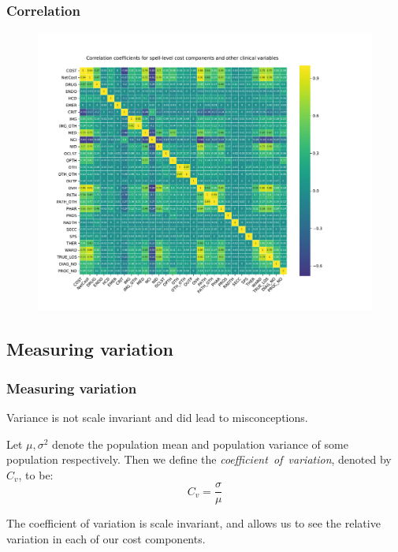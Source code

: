 \documentclass{beamer}
\begin{document}
\begin{frame}
    \frametitle{Correlation}

    \vspace{-15pt}
    \begin{figure}
        \centering
        \includegraphics[width=\linewidth]{./img/corr_heatmap.pdf}
    \end{figure}
\end{frame}


\subsection{Measuring variation}

\begin{frame}
    \frametitle{Measuring variation}

    Variance is not scale invariant and did lead to misconceptions.

    \pause%
    \vspace{10pt}
    \begin{definition}
        Let \(\mu, \sigma^2\) denote the population mean and population variance
        of some population respectively. Then we define the
        \emph{coefficient~of~variation}, denoted by \(C_v\), to be:
        \[
            C_v = \frac{\sigma}{\mu}
        \]
    \end{definition}

    \pause%
    The coefficient of variation is scale invariant, and allows us to see the
    relative variation in each of our cost components.
\end{frame}
\end{document}
